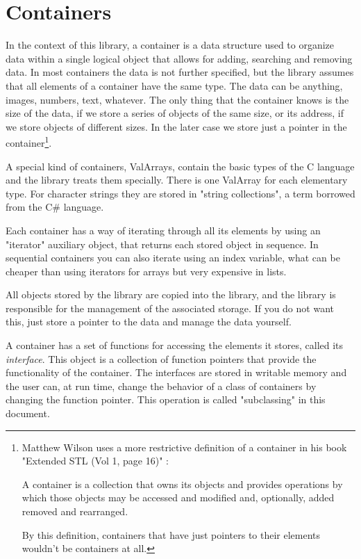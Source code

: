 \documentclass[12pt,a4paper]{memoir} %
\begin{document}
\section{Containers}
In the context of this library, a container is a data structure used to organize data within a single logical object that allows for adding, searching 
and removing data. In most containers the data is not further specified, but the library assumes that all elements of a container have the same type. 
The data can be anything, images, numbers, text, whatever. The only thing that the container knows is the size of the data, if we store a series of 
objects of the same size, or its address, if we store objects of different sizes. In the later case we store just a pointer in the 
container\footnote{Matthew Wilson uses a more restrictive definition of a container in his book "Extended STL (Vol 1, page 16)" :\par A container is a 
collection that owns its objects and provides operations by which those objects may be accessed and modified and, optionally, added removed and 
rearranged.\par By this definition, containers that have just pointers to their elements wouldn't be containers at all.}.

A special kind of containers, ValArrays, contain the basic types of the C language and the library treats them specially. There is one ValArray
for each elementary type. For character strings they are stored in "string collections", a term borrowed from the C\# language.

Each container has a way of iterating through all its elements by using an "iterator" auxiliary object, that returns each stored object in sequence. In 
sequential containers you can also iterate using an index variable, what can be cheaper than using iterators for arrays but very expensive in lists.

All objects stored by the library are copied into the library, and the library is responsible for the management of the associated storage. If you do not want this, just store a pointer to the data and manage the data yourself.

A container has a set of functions for accessing the elements it stores, called its \textsl{interface}. This object is a collection of function
pointers that provide the functionality of the container.  The interfaces are stored in writable memory and the user can, at run time, change the
behavior of a class of containers by changing the function pointer. This operation is called "subclassing" in this document.
\end{document}
